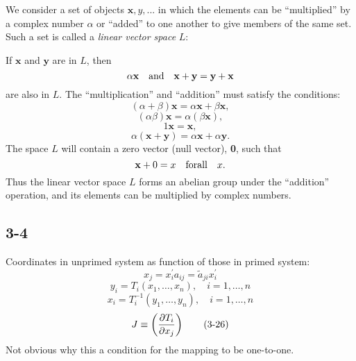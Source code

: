 \documentclass{article}
\begin{document}
\def\bx{\mathbf x}
\def\by{\mathbf y}

We consider a set of objects $\mathbf x,y,...$ in which the elements can be ``multiplied'' by a complex number $\alpha$ or ``added'' to one another to give members of the same set. Such a set is called a {\it linear vector space} $L$:

If $\bx$ and $\by$ are in $L$, then
$$
\alpha{\mathbf x} \quad {\rm and} \quad {\bx+\by = \by+\bx}
$$
are also in $L$. The ``multiplication'' and ``addition'' must satisfy the conditions:
$$(\alpha + \beta)\bx = \alpha\bx + \beta\bx,$$
$$(\alpha\beta)\bx = \alpha(\beta\bx),$$
$$1\bx = \bx,$$
$$\alpha(\bx+\by) = \alpha\bx + \alpha\by.$$
The space $L$ will contain a zero vector (null vector), {\bf 0}, such that
$$\mathbf x + 0 = x \quad {\rm for all} \quad x.$$
Thus the linear vector space $L$ forms an abelian group under the ``addition'' operation, and its elements can be multiplied by complex numbers.

\subsection{3-4}

Coordinates in unprimed system as function of those in primed system:
\begin{equation}
x_j = x^\prime_ia_{ij} = \tilde a_{ji}x^\prime_i\tag{3-16}
\end{equation}
\begin{equation}
y_i = T_i(x_1,\dots,x_n), \quad i=1,\dots,n\tag{3-25}
\end{equation}
\begin{equation}
x_i = T^{-1}_i(y_1,\dots,y_n), \quad i=1,\dots,n\tag{3-25a}
\end{equation}
\begin{equation}
J \equiv \left( \partial T_i\over\partial x_j \right) \tag{3-26}
\end{equation}
Not obvious why this a condition for the mapping to be one-to-one.
\end{document}
